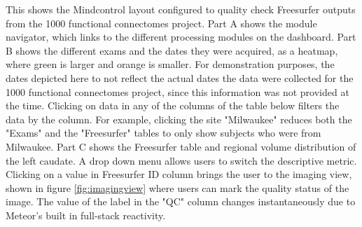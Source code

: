 \label{fig:dashboard}

This shows the Mindcontrol layout configured to quality check Freesurfer outputs from the 1000 functional connectomes project. Part A shows the module navigator, which links to the different processing modules on the dashboard. Part B shows the different exams and the dates they were acquired, as a heatmap, where green is larger and orange is smaller. For demonstration purposes, the dates depicted here to not reflect the actual dates the data were collected for the 1000 functional connectomes project, since this information was not provided at the time. Clicking on data in any of the columns of the table below filters the data by the column. For example, clicking the site "Milwaukee" reduces both the "Exams" and the "Freesurfer" tables to only show subjects who were from Milwaukee. Part C shows the Freesurfer table and regional volume distribution of the left caudate. A drop down menu allows users to switch the descriptive metric. Clicking on a value in Freesurfer ID column brings the user to the imaging view, shown in figure \ref{fig:imagingview} where users can mark the quality status of the image. The value of the label in the "QC" column changes instantaneously due to Meteor's built in full-stack reactivity. 